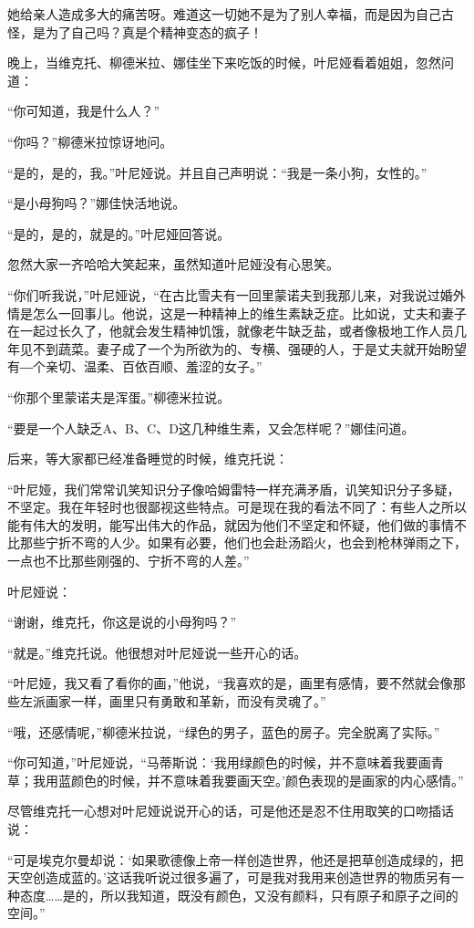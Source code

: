 她给亲人造成多大的痛苦呀。难道这一切她不是为了别人幸福，而是因为自己古怪，是为了自己吗？真是个精神变态的疯子！

晚上，当维克托、柳德米拉、娜佳坐下来吃饭的时候，叶尼娅看着姐姐，忽然问道：

“你可知道，我是什么人？”

“你吗？”柳德米拉惊讶地问。

“是的，是的，我。”叶尼娅说。并且自己声明说：“我是一条小狗，女性的。”

“是小母狗吗？”娜佳快活地说。

“是的，是的，就是的。”叶尼娅回答说。

忽然大家一齐哈哈大笑起来，虽然知道叶尼娅没有心思笑。

“你们听我说，”叶尼娅说，“在古比雪夫有一回里蒙诺夫到我那儿来，对我说过婚外情是怎么一回事儿。他说，这是一种精神上的维生素缺乏症。比如说，丈夫和妻子在一起过长久了，他就会发生精神饥饿，就像老牛缺乏盐，或者像极地工作人员几年见不到蔬菜。妻子成了一个为所欲为的、专横、强硬的人，于是丈夫就开始盼望有―个亲切、温柔、百依百顺、羞涩的女子。”

“你那个里蒙诺夫是浑蛋。”柳德米拉说。

“要是一个人缺乏A、B、C、D这几种维生素，又会怎样呢？”娜佳问道。

后来，等大家都已经准备睡觉的时候，维克托说：

“叶尼娅，我们常常讥笑知识分子像哈姆雷特一样充满矛盾，讥笑知识分子多疑，不坚定。我在年轻时也很鄙视这些特点。可是现在我的看法不同了：有些人之所以能有伟大的发明，能写出伟大的作品，就因为他们不坚定和怀疑，他们做的事情不比那些宁折不弯的人少。如果有必要，他们也会赴汤蹈火，也会到枪林弹雨之下，一点也不比那些刚强的、宁折不弯的人差。”

叶尼娅说：

“谢谢，维克托，你这是说的小母狗吗？”

“就是。”维克托说。他很想对叶尼娅说一些开心的话。

“叶尼娅，我又看了看你的画，”他说，“我喜欢的是，画里有感情，要不然就会像那些左派画家一样，画里只有勇敢和革新，而没有灵魂了。”

“哦，还感情呢，”柳德米拉说，“绿色的男子，蓝色的房子。完全脱离了实际。”

“你可知道，”叶尼娅说，“马蒂斯说：‘我用绿颜色的时候，并不意味着我要画青草；我用蓝颜色的时候，并不意味着我要画天空。’颜色表现的是画家的内心感情。”

尽管维克托一心想对叶尼娅说说开心的话，可是他还是忍不住用取笑的口吻插话说：

“可是埃克尔曼却说：‘如果歌德像上帝一样创造世界，他还是把草创造成绿的，把天空创造成蓝的。’这话我听说过很多遍了，可是我对我用来创造世界的物质另有一种态度……是的，所以我知道，既没有颜色，又没有颜料，只有原子和原子之间的空间。”

